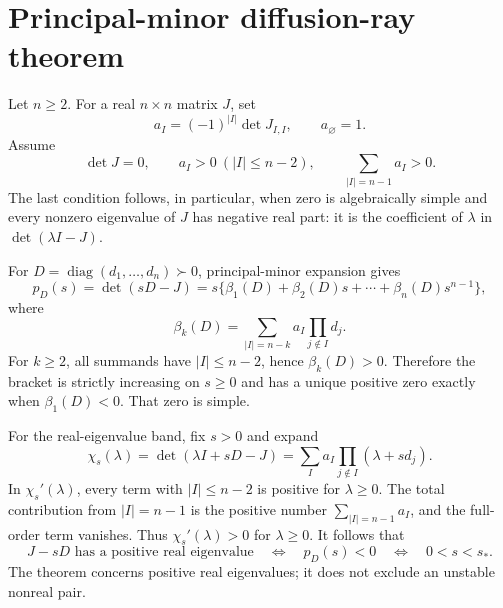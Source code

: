\section*{Principal-minor diffusion-ray theorem}
Let $n\ge2$.  For a real $n\times n$ matrix $J$, set
\[
 a_I=(-1)^{|I|}\det J_{I,I},\qquad a_\varnothing=1.
\]
Assume
\[
 \det J=0,\qquad a_I>0\ (|I|\le n-2),\qquad
 \sum_{|I|=n-1}a_I>0.
\]
The last condition follows, in particular, when zero is algebraically simple
and every nonzero eigenvalue of $J$ has negative real part: it is the
coefficient of $\lambda$ in $\det(\lambda I-J)$.

For $D=\operatorname{diag}(d_1,\ldots,d_n)\succ0$, principal-minor expansion
gives
\[
 p_D(s)=\det(sD-J)
 =s\{\beta_1(D)+\beta_2(D)s+\cdots+\beta_n(D)s^{n-1}\},
\]
where
\[
 \beta_k(D)=\sum_{|I|=n-k}a_I\prod_{j\notin I}d_j.
\]
For $k\ge2$, all summands have $|I|\le n-2$, hence $\beta_k(D)>0$.
Therefore the bracket is strictly increasing on $s\ge0$ and has a unique
positive zero exactly when $\beta_1(D)<0$.  That zero is simple.

For the real-eigenvalue band, fix $s>0$ and expand
\[
 \chi_s(\lambda)=\det(\lambda I+sD-J)
 =\sum_Ia_I\prod_{j\notin I}(\lambda+sd_j).
\]
In $\chi_s'(\lambda)$, every term with $|I|\le n-2$ is positive for
$\lambda\ge0$.  The total contribution from $|I|=n-1$ is the positive number
$\sum_{|I|=n-1}a_I$, and the full-order term vanishes.  Thus
$\chi_s'(\lambda)>0$ for $\lambda\ge0$.  It follows that
\[
 J-sD\text{ has a positive real eigenvalue}
 \quad\Longleftrightarrow\quad
 p_D(s)<0
 \quad\Longleftrightarrow\quad
 0<s<s_*.
\]
The theorem concerns positive real eigenvalues; it does not exclude an
unstable nonreal pair.
